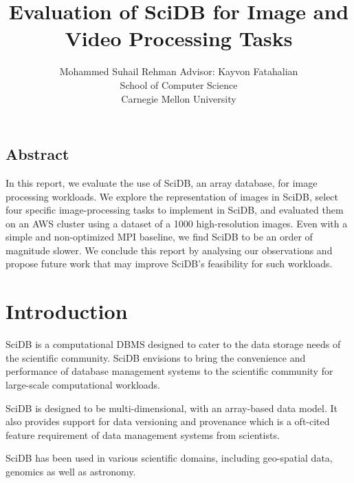 \documentclass[letterpaper,twocolumn,10pt]{article}
\begin{document}
\date{}

\title{\Large \bf Evaluation of SciDB for Image and Video Processing Tasks}

\author{
{\rm Mohammed Suhail Rehman \qquad Advisor: Kayvon Fatahalian}\\
School of Computer Science\\
Carnegie Mellon University
} %

\maketitle

\thispagestyle{empty}


\subsection*{Abstract}
In this report, we evaluate the use of SciDB, an array database, for image processing workloads. We explore the representation of images in SciDB, select four specific image-processing tasks to implement in SciDB, and evaluated them on an AWS cluster using a dataset of a 1000 high-resolution images. Even with a simple and non-optimized MPI baseline, we find SciDB to be an order of magnitude slower. We conclude this report by analysing our observations and propose future work that may improve SciDB's feasibility for such workloads.

\section{Introduction}


SciDB\cite{stonebraker2013scidb} is a computational DBMS designed to cater to the data storage needs of the scientific community. SciDB envisions to bring the convenience and performance of database management systems to the scientific community for large-scale computational workloads.

SciDB is designed to be multi-dimensional, with an array-based data model. It also provides support for data versioning and provenance which is a oft-cited feature requirement of data management systems from scientists.
 
SciDB has been used in various scientific domains, including geo-spatial data, genomics\cite{stonebraker2011architecture} as well as astronomy\cite{Cudre-Mauroux:2009:DSS:1687553.1687584}.
\end{document}

